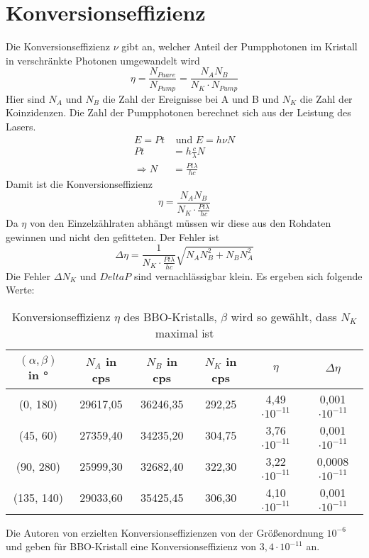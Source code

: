 \documentclass[twoside,colorback,accentcolor=tud4c,11pt]{tudreport}
\begin{document}
\section{Konversionseffizienz}
Die Konversionseffizienz $ \nu $ gibt an, welcher Anteil der Pumpphotonen im Kristall in verschränkte Photonen umgewandelt wird \cite{paper}
\begin{equation}
\eta = \frac{N_{Paare}}{N_{Pump}}=\frac{N_{A}N_{B}}{N_{K}\cdot N_{Pump}}
\end{equation}
Hier sind $ N_{A} $ und $ N_{B} $ die Zahl der Ereignisse bei A und B und $ N_{K} $ die Zahl der Koinzidenzen. Die Zahl der Pumpphotonen berechnet sich aus der Leistung des Lasers.
\begin{align*}
E=P t &\text{ und } E=h \nu N\\
P t &= h \frac{c}{\lambda} N\\
\Rightarrow N &= \frac{P t \lambda}{h c}
\end{align*}
Damit ist die Konversionseffizienz 
\begin{equation}
\eta=\frac{N_{A}N_{B}}{N_{K}\cdot \frac{P t \lambda}{h c}}
\end{equation}
Da $ \eta $ von den Einzelzählraten abhängt müssen wir diese aus den Rohdaten gewinnen und nicht den gefitteten. Der Fehler ist 
\begin{equation}
\Delta\eta=\frac{1}{N_{K}\cdot \frac{P t \lambda}{h c}}\sqrt{N_{A}N_{B}^2+N_{B}N_{A}^2}
\end{equation}
Die Fehler $ \Delta N_K $ und $ Delta P $ sind vernachlässigbar klein. Es ergeben sich folgende Werte:
\begin{table}[H]
\renewcommand*{\arraystretch}{1.2}
\centering
\begin{tabular}{|c|c|c|c|c|c|}
\hline 
$(\alpha,\beta)$ in ° & $ N_A $ in cps & $ N_B $ in cps & $ N_K $ in cps & $ \eta $ &$ \Delta\eta $\\ 
\hline 
(0, 180) & 29617,05 &36246,35& 292,25& 4,49$\cdot10^{-11}$& 0,001$\cdot10^{-11}$ \\ 
\hline 
(45, 60) & 27359,40& 34235,20 &304,75 &3,76$\cdot10^{-11}$& 0,001$\cdot10^{-11}$ \\ 
\hline 
(90, 280) & 25999,30& 32682,40 &322,30 &3,22$\cdot10^{-11}$ & 0,0008$\cdot10^{-11}$\\ 
\hline 
(135, 140) & 29033,60 &35425,45&306,30 &4,10$\cdot10^{-11}$ & 0,001$\cdot10^{-11}$\\ 
\hline 
\end{tabular} 
\caption{Konversionseffizienz $ \eta $ des BBO-Kristalls, $ \beta $ wird so gewählt, dass $ N_K $ maximal ist}\label{effizienz}
\end{table}
Die Autoren von \cite{paper} erzielten Konversionseffizienzen von der Größenordnung $ 10^{-6} $ und geben für BBO-Kristall eine Konversionseffizienz von $ 3,4\cdot10^{-11} $ an.
\end{document}

